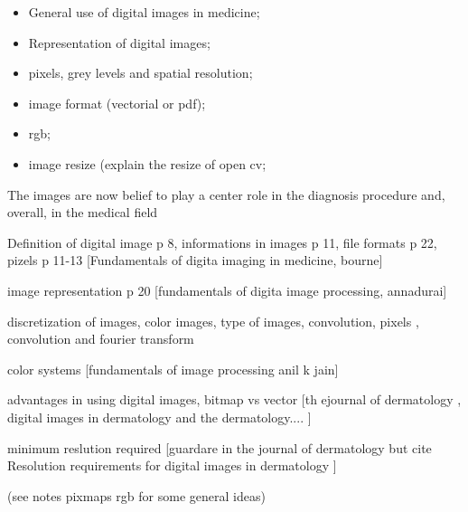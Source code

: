 \documentclass[../main.tex]{subfiles}
\begin{document}
\begin{itemize}

    \item General use of digital images in medicine;
    \item Representation of digital images;
    \item pixels, grey levels and spatial resolution;
    \item image format (vectorial or pdf);
    \item rgb;
    \item image resize (explain the resize of open cv;
\end{itemize}
The images are now belief to play a center role in the diagnosis procedure and, overall, in the medical field

Definition of digital image p 8, informations in images p 11,  file formats p 22, pizels p 11-13 [Fundamentals of digita imaging in medicine, bourne]

image representation p 20 [fundamentals of digita image processing, annadurai]

discretization of images, color images, type of images, convolution, pixels , convolution and fourier transform \cite{digital_processing_matlab}

 color systems [fundamentals of image processing anil k jain]
 
 advantages in using digital images, bitmap vs vector [th ejournal of dermatology , digital images in dermatology and the dermatology.... \cite{journal_of_dermatology}]
 
 minimum reslution required [guardare in the journal of dermatology but cite Resolution requirements for digital images in dermatology \cite{resolution_requirements}]
 
 (see notes pixmaps rgb for some general ideas)
\end{document}

